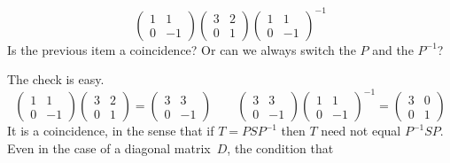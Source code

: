 \begin{exercises}
\begin{exparts}
\begin{equation*}
\begin{pmatrix}
             1  &1  \\
             0  &-1
           \end{pmatrix}
           \begin{pmatrix}
             3  &2  \\
             0  &1
           \end{pmatrix}
           \begin{pmatrix}
             1  &1  \\
             0  &-1
           \end{pmatrix}^{-1}
        \end{equation*}
      \partsitem Is the previous item a coincidence?
        Or can we always switch the $P$ and the $P^{-1}$?
   \end{exparts}
   \begin{answer}
     \begin{exparts}
       \partsitem The check is easy.
         \begin{equation*}
           \begin{pmatrix}
             1  &1  \\
             0  &-1
           \end{pmatrix}
           \begin{pmatrix}
             3  &2  \\
             0  &1
           \end{pmatrix}
           =
           \begin{pmatrix}
             3  &3  \\
             0  &-1
           \end{pmatrix}
           \qquad
           \begin{pmatrix}
             3  &3  \\
             0  &-1
           \end{pmatrix}
           \begin{pmatrix}
             1  &1  \\
             0  &-1
           \end{pmatrix}^{-1}
           =
           \begin{pmatrix}
             3  &0  \\
             0  &1
           \end{pmatrix}
         \end{equation*}
        \partsitem It is a coincidence, in the sense that if $T=PSP^{-1}$
          then $T$ need not equal $P^{-1}SP$.
          Even in the case of a diagonal matrix~$D$, the condition that

\end{exparts}
\end{answer}
\end{exercises}
